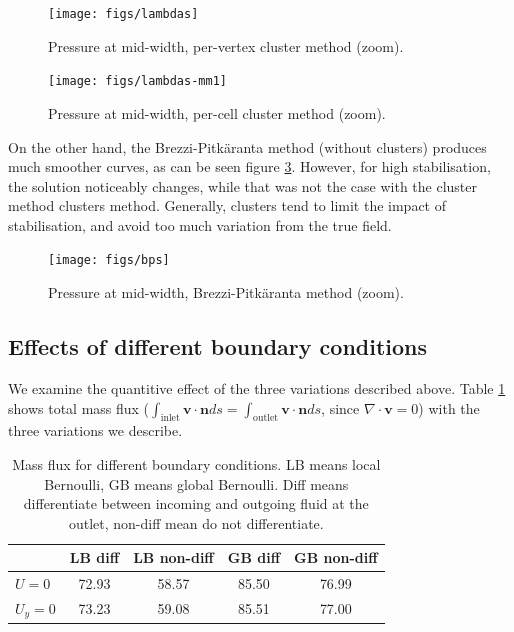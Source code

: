 \documentclass[12pt]{article}
\newcommand{\vb}[1]{\ensuremath{\boldsymbol #1}}
\begin{document}
\begin{figure}[h!]
\centering
\texttt{[image: figs/lambdas]}
\caption{Pressure at mid-width, per-vertex cluster method (zoom).}
\label{fig:lambdas}
\end{figure}


\begin{figure}[h!]
\centering
\texttt{[image: figs/lambdas-mm1]}
\caption{Pressure at mid-width, per-cell cluster method (zoom).}
\label{fig:lambdas-mm1}
\end{figure}

On the other hand, the Brezzi-Pitk\"aranta method (without clusters)
produces much smoother curves, as can be seen figure
\ref{fig:bps}. However, for high stabilisation, the solution
noticeably changes, while that was not the case with the cluster
method clusters method. Generally, clusters tend to limit the impact
of stabilisation, and avoid too much variation from the true field.

\begin{figure}[h!]
\centering
\texttt{[image: figs/bps]}
\caption{Pressure at mid-width, Brezzi-Pitk\"aranta method (zoom).}
\label{fig:bps}
\end{figure}
\subsection{Effects of different boundary conditions}
\label{effect-bc}
We examine the quantitive effect of the three variations described
above. Table \ref{table:debits} shows total mass flux
($\int_{\text{inlet}} \vb{v} \cdot \vb{n} ds = \int_{\text{outlet}}
\vb{v} \cdot \vb{n} ds$, since $\nabla \cdot \vb v = 0$) with the
three variations we describe.


\begin{table}[!h]
  \centering
  \begin{tabular}{|l|c|c|c|c|}
    \hline
    & LB diff & LB non-diff & GB diff & GB non-diff \\
    \hline
    $U = 0$ & 72.93 & 58.57 & 85.50 & 76.99\\
    $U_y = 0$ & 73.23 & 59.08 & 85.51 & 77.00 \\
    \hline
  \end{tabular}
  \caption[Mass flux for different boundary conditions]{
    Mass flux for different boundary conditions. LB means local
    Bernoulli, GB means global Bernoulli. Diff means differentiate
    between incoming and outgoing fluid at the outlet, non-diff mean do
    not differentiate.}
  \label{table:debits}
\end{table}
\end{document}
